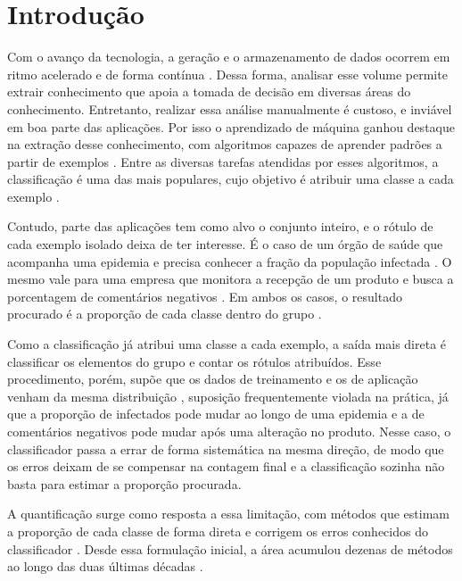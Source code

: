 \chapter{Introdução}
\label{cap:introducao}

Com o avanço da tecnologia, a geração e o armazenamento de dados ocorrem em ritmo
acelerado e de forma contínua \cite{faceli2021}. Dessa forma, analisar esse volume
permite extrair conhecimento que apoia a tomada de decisão em diversas áreas do
conhecimento. Entretanto, realizar essa análise manualmente é custoso, e inviável em boa
parte das aplicações. Por isso o aprendizado de máquina ganhou destaque na extração desse
conhecimento, com algoritmos capazes de aprender padrões a partir de exemplos
\cite{mitchell1997}. Entre as diversas tarefas atendidas por esses algoritmos, a
classificação é uma das mais populares, cujo objetivo é atribuir uma classe a cada
exemplo \cite{bishop2006}.

Contudo, parte das aplicações tem como alvo o conjunto inteiro, e o rótulo de cada
exemplo isolado deixa de ter interesse. É o caso de um órgão de saúde que acompanha uma
epidemia e precisa conhecer a fração da população infectada \cite{kinglu2008verbal}. O
mesmo vale para uma empresa que monitora a recepção de um produto e busca a porcentagem
de comentários negativos \cite{esuli2015}. Em ambos os casos, o resultado procurado é a
proporção de cada classe dentro do grupo \cite{gonzalez2017}.

Como a classificação já atribui uma classe a cada exemplo, a saída mais direta é
classificar os elementos do grupo e contar os rótulos atribuídos. Esse procedimento, porém,
supõe que os dados de treinamento e os de aplicação venham da mesma distribuição
\cite{morenotorres2012unifying}, suposição frequentemente violada na prática, já que a
proporção de infectados pode mudar ao longo de uma epidemia e a de comentários negativos
pode mudar após uma alteração no produto. Nesse caso, o classificador passa a errar de
forma sistemática na mesma direção, de modo que os erros deixam de se compensar na
contagem final \cite{forman2008} e a classificação sozinha não basta para estimar a
proporção procurada.

A quantificação surge como resposta a essa limitação, com métodos que estimam a proporção
de cada classe de forma direta e corrigem os erros conhecidos do classificador
\cite{forman2005}. Desde essa formulação inicial, a área acumulou dezenas de métodos ao
longo das duas últimas décadas \cite{esuli2023}.

